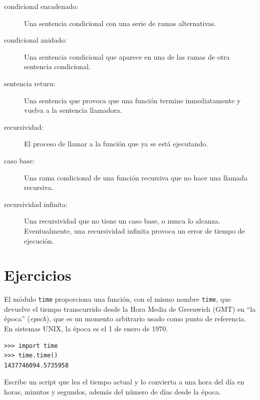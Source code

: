 \documentclass[10pt]{book}
\begin{document}
\begin{description}
\item[condicional encadenado:]  Una sentencia condicional con una serie
de ramas alternativas.

\item[condicional anidado:]  Una sentencia condicional que aparece
en una de las ramas de otra sentencia condicional.

\item[sentencia return:] Una sentencia que provoca que una función
termine inmediatamente y vuelva a la sentencia llamadora.

\item[recursividad:]  El proceso de llamar a la función que ya se está
ejecutando.

\item[caso base:]  Una rama condicional de una
función recursiva que no hace una llamada recursiva.

\item[recursividad infinita:]  Una recursividad que no tiene un
caso base, o nunca lo alcanza.  Eventualmente, una recursividad infinita
provoca un error de tiempo de ejecución.

\end{description}

\section{Ejercicios}

\begin{exercise}

El módulo {\tt time} proporciona una función, con el mismo nombre {\tt time}, que
devuelve el tiempo transcurrido desde la Hora Media de Greenwich (GMT) en ``la época'' ({\em epoch}), que es
un momento arbitrario usado como punto de referencia.  En sistemas UNIX, la
época es el 1 de enero de 1970.

\begin{verbatim}
>>> import time
>>> time.time()
1437746094.5735958
\end{verbatim}

Escribe un script que lea el tiempo actual y lo convierta a
una hora del día en horas, minutos y segundos, además del número de
días desde la época.

\end{exercise}
\end{document}
